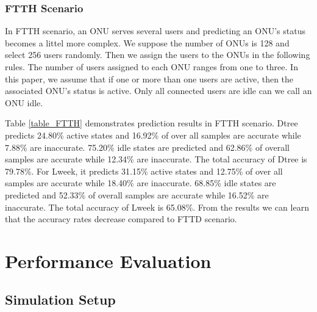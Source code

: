 \documentclass[journal]{IEEEtran}
\begin{document}
\subsubsection{FTTH Scenario}
In FTTH scenario, an ONU serves several users and predicting an ONU's status becomes a littel more complex. We suppose the number of ONUs is 128 and select 256 users randomly. Then we assign the users to the ONUs in the following rules. The number of users assigned to each ONU ranges from one to three. In this paper, we assume that if one or more than one users are active, then the associated ONU's status is active. Only all connected users are idle can we call an ONU idle. 

Table \ref{table_FTTH} demonstrates prediction results in FTTH scenario. Dtree predicts 24.80\% active states and 16.92\% of over all samples are accurate while 7.88\% are inaccurate. 75.20\% idle states are predicted and 62.86\% of overall samples are accurate while 12.34\% are inaccurate. The total accuracy of Dtree is 79.78\%. For Lweek, it predicts 31.15\% active states and 12.75\% of over all samples are accurate while 18.40\% are inaccurate. 68.85\% idle states are predicted and 52.33\% of overall samples are accurate while 16.52\% are inaccurate. The total accuracy of Lweek is 65.08\%. From the results we can learn that the accuracy rates decrease compared to FTTD scenario.

\section{Performance Evaluation}
\subsection{Simulation Setup}
\end{document}
